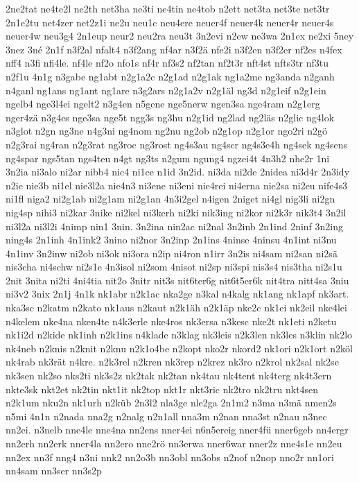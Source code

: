 {2ne2tat
ne4te2l
ne2th
net3ha
ne3ti
ne4tin
ne4tob
n2ett
net3ta
net3te
net3tr
2n1e2tu
net4zer
net2z1i
ne2u
neu1c
neu4ere
neuer4f
neuer4k
neuer4r
neuer4s
neuer4w
neu3g4
2n1eup
neur2
neu2ra
neu3t
3n2evi
n2ew
ne3wa
2n1ex
ne2xi
5ney
3nez
3né
2n1f
n3f2al
nfalt4
n3f2ang
nf4ar
n3f2ä
nfe2i
n3f2en
n3f2er
nf2es
n4fex
nff4
n3fi
nfi4le.
nf4le
nf2o
nfo1s
nf4r
nf3s2
nf2tan
nf2t3r
nft4st
nfts3tr
nf3tu
n2f1u
4n1g
n3gabe
ng1abt
n2g1a2c
n2g1ad
n2g1ak
ng1a2me
ng3anda
n2ganh
n4ganl
ng1ans
ng1ant
ng1are
n3g2ars
n2g1a2v
n2g1äl
ng3d
n2g1eif
n2g1ein
ngelb4
nge3l4ei
ngelt2
n3g4en
n5gene
nge5nerw
ngen3sa
nge4ram
n2g1erg
nger4zä
n3g4es
nge3sa
nge5t
ngg3s
ng3hu
n2g1id
ng2lad
ng2läs
n2glic
ng4lok
n3glot
n2gn
ng3ne
n4g3ni
ng4nom
ng2nu
ng2ob
n2g1op
n2g1or
ngo2ri
n2gö
n2g3rai
ng4ran
n2g3rat
ng3roc
ng3rost
ng4s3au
ng4scr
ng4s3e4h
ng4sek
ng4sens
ng4spar
ngs5tan
ngs4teu
n4gt
ng3ts
n2gum
ngung4
ngzei4t
4n3h2
nhe2r
1ni
3n2ia
ni3alo
ni2ar
nibb4
nic4
ni1ce
n1id
3n2id.
ni3da
ni2de
2nidea
ni3d4r
2n3idy
n2ie
nie3b
ni1el
nie3l2a
nie4n3
ni3ene
ni3eni
nie4rei
ni4erna
nie2sa
ni2eu
nife4s3
ni1fl
niga2
ni2g1ab
ni2g1am
ni2g1an
4n3i2gel
n4igen
2niget
ni4gl
nig3li
ni2gn
nig4sp
nihi3
ni2kar
3nike
ni2kel
ni3kerh
ni2ki
nik3ing
ni2kor
ni2k3r
nik3t4
3n2il
ni3l2a
ni3l2i
4nimp
nin1
3nin.
3n2ina
nin2ac
ni2nal
3n2inb
2n1ind
2ninf
3n2ing
ning4s
2n1inh
4n1ink2
3nino
ni2nor
3n2inp
2n1ins
4ninse
4ninsu
4n1int
ni3nu
4n1inv
3n2inw
ni2ob
ni3ok
ni3ora
n2ip
ni4ron
n1irr
3n2is
ni4sam
ni2san
ni2sä
nis3cha
ni4schw
ni2s1e
4n3isol
ni2som
4nisot
ni2sp
ni3spi
nis3s4
nis3tha
ni2s1u
2nit
3nita
ni2ti
4ni4tia
nit2o
3nitr
nit3s
nit6ter6g
nit6t5er6k
nit4tra
nitt4sa
3niu
ni3v2
3nix
2n1j
4n1k
nk1abr
n2k1ac
nka2ge
n3kal
n4kalg
nk1ang
nk1apf
nk3art.
nka3sc
n2katm
n2kato
nk1aus
n2kaut
n2k1äh
n2k1äp
nke2c
nk1ei
nk2eil
nke4lei
n4kelem
nke4na
nken4te
n4k3erle
nke4ros
nk3ersa
n3kesc
nke2t
nk1eti
n2ketu
nk1i2d
n2kide
nk1inh
n2k1ins
n4klade
n3klag
nk3leis
n2k3len
nk3les
n3klin
nk2lo
nk4neb
n2knis
n2knit
n2knu
n2k1o4be
n2kopt
nko2r
nkord2
nk1ori
n2k1ort
n2köl
nk4rab
nk3rät
n4kre.
n2k3rel
n2kren
nk3rep
n2krez
nk3ro
n2krol
nk2sal
nk2se
nk3sen
nk2so
nks2ti
nk3s2z
nk2tak
nk2tan
nk4tau
nk4tent
nk4terg
nk4t3ern
nkte3sk
nkt2et
nk2tin
nkt1it
nk2top
nkt1r
nkt3ric
nk2tro
nk2tru
nkt4sen
n2k1um
nku2n
nk1urh
n2küb
2n3l2
nla3ge
nle2ga
2n1m2
n3ma
n3mä
nmen2s
n5mi
4n1n
n2nada
nna2g
n2nalg
n2n1all
nna3m
n2nan
nna3st
n2nau
n3nec
nn2ei.
n3nelb
nne4le
nne4na
nn2ens
nner4ei
n6n5ereig
nner4fü
nner6geb
nn4ergr
nn2erh
nn2erk
nner4la
nn2ero
nne2rö
nn3erwa
nner6war
nner2z
nne4s1e
nn2eu
nn2ex
nn3f
nng4
n3ni
nnk2
nn2o3b
nn3obl
nn3obs
n2nof
n2nop
nno2r
nn1ori
nn4sam
nn3ser
nn3s2p
}
